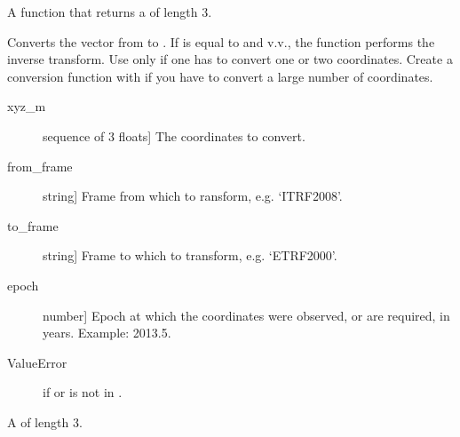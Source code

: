 \documentclass[a4paper,10pt,english]{sphinxmanual}
\begin{document}
\begin{fulllineitems}
\begin{fulllineitems}
\begin{description}
\end{description}


A function  that returns a  of length
3.

\end{fulllineitems}


\begin{fulllineitems}
\label{\detokenize{api-docs:etrsitrs.datumtransformation.DatumTransformation.convert}}
Converts the  vector from  to
. If  is equal to  and
v.v., the function performs the inverse transform. Use only if
one has to convert one or two coordinates. Create a conversion
function with  if you have
to convert a large number of coordinates.

\begin{description}
\item[{xyz\_m}] \leavevmode{[}sequence of 3 floats{]}
The coordinates to convert.

\item[{from\_frame}] \leavevmode{[}string{]}
Frame from which to ransform, e.g. ‘ITRF2008’.

\item[{to\_frame}] \leavevmode{[}string{]}
Frame to which to transform, e.g. ‘ETRF2000’.

\item[{epoch}] \leavevmode{[}number{]}
Epoch at which the coordinates were observed, or are
required, in years. Example: 2013.5.

\end{description}

\begin{description}
\item[{ValueError}] \leavevmode
if  or  is not in .

\end{description}


A  of length 3.

\end{fulllineitems}


\end{fulllineitems}
\end{document}
